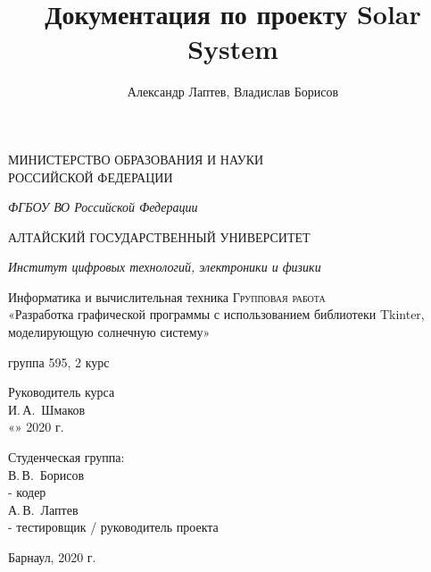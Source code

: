 \documentclass[11pt,a4paper]{report}
\author{Александр Лаптев, Владислав Борисов}
\title{Документация по проекту Solar System}
\begin{document}
\begin{titlepage}
 \begin{center}
    \large
    МИНИСТЕРСТВО ОБРАЗОВАНИЯ И НАУКИ\\ РОССИЙСКОЙ ФЕДЕРАЦИИ
     
    \textit{ФГБОУ ВО Российской Федерации}
    \vspace{0.5cm}
 
    АЛТАЙСКИЙ ГОСУДАРСТВЕННЫЙ УНИВЕРСИТЕТ
    
    \vspace{0.25cm}
     
    \textit{Институт цифровых технологий, электроники и физики}
    
    \vfill 
    Информатика и вычислительная техника
    \vfill
    \textsc{Групповая работа}\\[5mm]
     
    {\LARGE «Разработка графической программы с использованием библиотеки Tkinter, моделирующую солнечную систему»}
  \bigskip
     
     группа 595, 2 курс
\end{center}
\vfill
 
\newlength{\ML}
\hfill\begin{minipage}{0.5\textwidth}
  Руководитель курса\\
  \underline{\hspace{\ML}} И.\,А.~Шмаков\\
  «\underline{\hspace{0.5cm}}» \underline{\hspace{1cm}} 2020 г.
\end{minipage}%
\bigskip
 
\hfill\begin{minipage}{0.5\textwidth}
  Студенческая группа:\\
  \underline{\hspace{\ML}} В.\,В.~Борисов \\- кодер\\
  \underline{\hspace{\ML}} А.\,В.~Лаптев  \\- тестировщик / руководитель проекта\\
\end{minipage}%
\vfill
 
\begin{center}
  Барнаул, 2020 г.
\end{center}
\end{titlepage}
\end{document}
